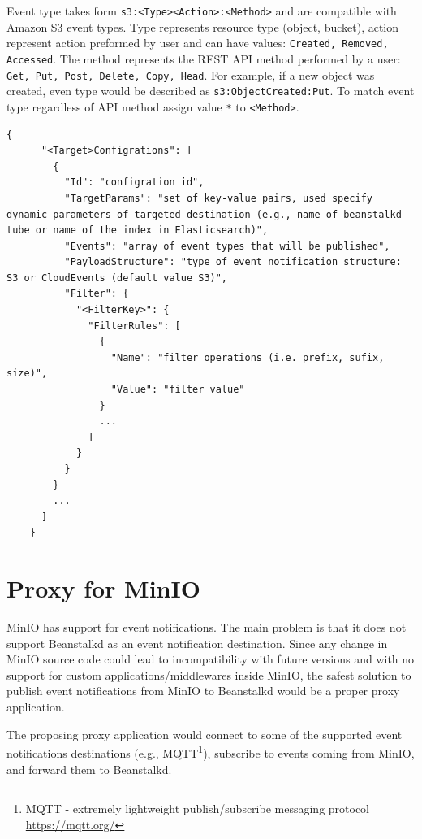     Event type takes form \texttt{s3:<Type><Action>:<Method>} and are compatible with Amazon S3 event types. Type represents resource type (object, bucket), action represent action preformed by user and can have values: \texttt{Created, Removed, Accessed}. The method represents the REST API method performed by a user: \texttt{Get, Put, Post, Delete, Copy, Head}. For example, if a new object was created, even type would be described as \texttt{\newline s3:ObjectCreated:Put}. To match event type regardless of API method assign value \texttt{*} to \texttt{<Method>}.

    \begin{minipage}{\linewidth}
    \begin{lstlisting}[style=jsonStyle, caption=Strucute of event notification configuration,    label=lst:eventConfiguration]
    {
      "<Target>Configrations": [
        {
          "Id": "configration id",
          "TargetParams": "set of key-value pairs, used specify dynamic parameters of targeted destination (e.g., name of beanstalkd tube or name of the index in Elasticsearch)",
          "Events": "array of event types that will be published",
          "PayloadStructure": "type of event notification structure: S3 or CloudEvents (default value S3)",
          "Filter": {
            "<FilterKey>": {
              "FilterRules": [
                {
                  "Name": "filter operations (i.e. prefix, sufix, size)",
                  "Value": "filter value"
                }
                ...
              ]
            }
          }
        }
        ...
      ]
    }
    \end{lstlisting}
    \end{minipage}


\section{Proxy for MinIO}
    MinIO has support for event notifications. The main problem is that it does not support Beanstalkd as an event notification destination. Since any change in MinIO source code could lead to incompatibility with future versions and with no support for custom applications/middlewares inside MinIO, the safest solution to publish event notifications from MinIO to Beanstalkd would be a proper proxy application.

    The proposing proxy application would connect to some of the supported event notifications destinations (e.g., MQTT\footnote{MQTT - extremely lightweight publish/subscribe messaging protocol {\url{https://mqtt.org/}}}), subscribe to events coming from MinIO, and forward them to Beanstalkd.

